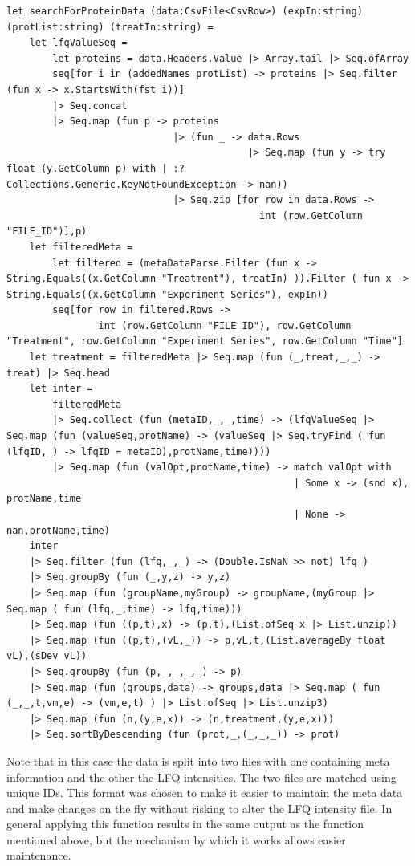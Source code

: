 \lstset{language=FSharp}
\begin{lstlisting}
let searchForProteinData (data:CsvFile<CsvRow>) (expIn:string) (protList:string) (treatIn:string) =
    let lfqValueSeq = 
        let proteins = data.Headers.Value |> Array.tail |> Seq.ofArray
        seq[for i in (addedNames protList) -> proteins |> Seq.filter (fun x -> x.StartsWith(fst i))]
        |> Seq.concat
        |> Seq.map (fun p -> proteins 
                             |> (fun _ -> data.Rows 
                                          |> Seq.map (fun y -> try float (y.GetColumn p) with | :? Collections.Generic.KeyNotFoundException -> nan))
                             |> Seq.zip [for row in data.Rows ->
                                            int (row.GetColumn "FILE_ID")],p)             
    let filteredMeta = 
        let filtered = (metaDataParse.Filter (fun x -> String.Equals((x.GetColumn "Treatment"), treatIn) )).Filter ( fun x -> String.Equals((x.GetColumn "Experiment Series"), expIn))
        seq[for row in filtered.Rows ->
                int (row.GetColumn "FILE_ID"), row.GetColumn "Treatment", row.GetColumn "Experiment Series", row.GetColumn "Time"]
    let treatment = filteredMeta |> Seq.map (fun (_,treat,_,_) -> treat) |> Seq.head
    let inter = 
        filteredMeta 
        |> Seq.collect (fun (metaID,_,_,time) -> (lfqValueSeq |> Seq.map (fun (valueSeq,protName) -> (valueSeq |> Seq.tryFind ( fun (lfqID,_) -> lfqID = metaID),protName,time))))
        |> Seq.map (fun (valOpt,protName,time) -> match valOpt with
                                                  | Some x -> (snd x), protName,time
                                                  | None -> nan,protName,time)
    inter
    |> Seq.filter (fun (lfq,_,_) -> (Double.IsNaN >> not) lfq )                      
    |> Seq.groupBy (fun (_,y,z) -> y,z) 
    |> Seq.map (fun (groupName,myGroup) -> groupName,(myGroup |> Seq.map ( fun (lfq,_,time) -> lfq,time)))   
    |> Seq.map (fun ((p,t),x) -> (p,t),(List.ofSeq x |> List.unzip))
    |> Seq.map (fun ((p,t),(vL,_)) -> p,vL,t,(List.averageBy float vL),(sDev vL))
    |> Seq.groupBy (fun (p,_,_,_,_) -> p)
    |> Seq.map (fun (groups,data) -> groups,data |> Seq.map ( fun (_,_,t,vm,e) -> (vm,e,t) ) |> List.ofSeq |> List.unzip3)
    |> Seq.map (fun (n,(y,e,x)) -> (n,treatment,(y,e,x)))
    |> Seq.sortByDescending (fun (prot,_,(_,_,_)) -> prot)
\end{lstlisting}
Note that in this case the data is split into two files with one containing meta information and the other the LFQ intensities. The two files are matched using unique IDs. This format was chosen to make it easier to maintain the meta data and make changes on the fly without risking to alter the LFQ intensity file. In general applying this function results in the same output as the function mentioned above, but the mechanism by which it works allows easier maintenance.\\
